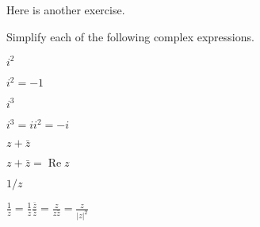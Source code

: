 Here is another exercise.
\begin{exercise}
Simplify each of the following complex expressions.
\begin{questions}
\question $i^2$
\begin{answer}
$i^2 = -1$
\end{answer}
\question $i^3$
\begin{answer}
$i^3 = i i^2 = -i$
\end{answer}
\question $z+\bar z$
\begin{answer}
$z+\bar z=\operatorname{Re} z$
\end{answer}
\question $1/z$
\begin{answer}
$\displaystyle\frac{1}{z}=\frac {1}{z}\frac{\bar z}{\bar z}=\frac{z}{z\bar z}=\frac{z}{|z|^2}$
\end{answer}
\end{questions}
\end{exercise}

\endinput

